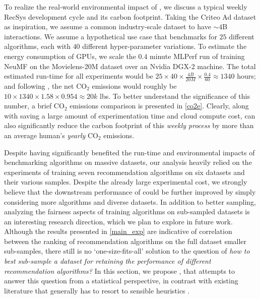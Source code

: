 To realize the real-world environmental impact of \oracle, we discuss a typical weekly RecSys development cycle 
and its carbon footprint. 
Taking the Criteo Ad dataset as inspiration, we assume a common industry-scale dataset to have $\sim4$B interactions.
We assume a hypothetical use case that benchmarks for \eg $25$ different algorithms, each with $40$ different hyper-parameter variations. To estimate the energy consumption of GPUs, we scale the $0.4$ minute MLPerf \cite{mlperf} run of training NeuMF \cite{neural_mf} on the Movielens-20M dataset over an Nvidia DGX-2 machine. The total estimated run-time for all experiments would be $25 \times 40 \times \frac{4B}{20M} \times \frac{0.4}{60} \approx 1340$ hours; and following \cite{co2e}, the net CO$_2$ emissions would roughly be $10 \times 1340 \times 1.58 \times 0.954 \approx 20k$ lbs. To better understand the significance of this number, a brief CO$_2$ emissions comparison is presented in \cref{co2e}. Clearly, \oracle along with saving a large amount of experimentation time and cloud compute cost, can also significantly reduce the carbon footprint of this \emph{weekly process} by more than an average human's \emph{yearly} CO$_2$ emissions.



Despite having significantly benefited the run-time and environmental impacts of benchmarking %
algorithms on massive datasets, our analysis heavily relied on the experiments of training seven 
recommendation algorithms on six datasets and their various samples. Despite the already large experimental cost, we strongly believe that the downstream performance of \oracle could be further improved by simply 
considering
more algorithms and diverse datasets.
In addition to better sampling, analyzing the fairness 
aspects of training algorithms on sub-sampled datasets is an interesting research direction, which we plan to explore in future work.
Although the results presented in \cref{main_exp} are indicative of correlation between the ranking of recommendation algorithms on the full dataset \vs smaller sub-samples, there still is no `one-size-fits-all' solution to the question of \emph{how to best sub-sample a dataset for retaining the performance of different recommendation algorithms?} In this section, we propose \oracle, that attempts to answer this question from a statistical perspective, in contrast with existing literature that generally has to resort to sensible heuristics \cite{large_graphs, scaling_up, sampling_cf_nn}.


